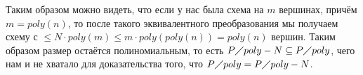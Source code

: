 \documentclass[a4paper,12pt]{article}
\begin{document}
\begin{solution}
\begin{itemize}
\begin{center}
		\end{center}
		
		Таким образом можно видеть, что если у нас была схема на $m$ вершинах, причём $m = poly(n)$, то после такого эквивалентного преобразования мы получаем схему с $\le N \cdot poly(m) \le m \cdot poly(poly(n)) = poly(n)$ вершин. Таким образом размер остаётся полиномиальным, то есть $P \diagup poly - N \subseteq P \diagup poly$, чего нам и не хватало для доказательства того, что $P \diagup poly = P \diagup poly - N$.
		
	\end{itemize}
\end{solution}
\end{document}
